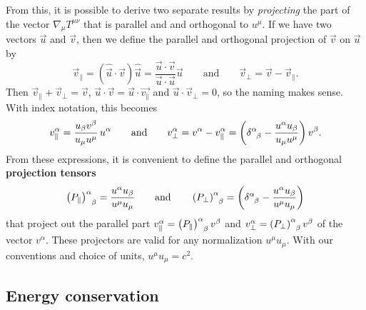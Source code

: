 From this, it is possible to derive two separate results by \emph{projecting} the part of the vector $\nabla_\mu T^{\mu \nu}$ that is parallel and and orthogonal to $u^\mu$.
If we have two vectors $\vec{u}$ and $\vec{v}$, then we define the parallel and orthogonal projection of $\vec{v}$ on $\vec{u}$ by
\begin{equation}
	\vec{v}_\parallel = \left( \hat{\vec{u}} \cdot \vec{v} \right) \hat{\vec{u}} = \frac{\vec{u} \cdot \vec{v}}{\vec{u} \cdot \vec{u}} \vec{u}
	\qquad \text{and} \qquad
	\vec{v}_\perp = \vec{v} - \vec{v}_\parallel .
\end{equation}
Then $\vec{v}_\parallel + \vec{v}_\perp = \vec{v}$, $\vec{u} \cdot \vec{v} = \vec{u} \cdot \vec{v_\parallel}$ and $\vec{u} \cdot \vec{v}_\perp = 0$, so the naming makes sense.
With index notation, this becomes
\begin{equation}
	v_\parallel^\alpha = \frac{u_\beta v^\beta}{u_\mu u^\mu} \, u^\alpha
	\qquad \text{and} \qquad
	v_\perp^\alpha = v^\alpha - v_\parallel^\alpha = \left( \delta\indices{^\alpha_\beta} - \frac{u^\alpha u_\beta}{u_\mu u^\mu} \right) v^\beta .
\end{equation}
From these expressions, it is convenient to define the parallel and orthogonal \textbf{projection tensors}
\begin{equation}
	\left(P_\parallel\right) \indices{^\alpha_\beta} = \frac{u^\alpha u_\beta}{u^\mu u_\mu}
	\qquad \text{and} \qquad
	\left(P_\perp\right) \indices{^\alpha_\beta} = \left( \delta\indices{^\alpha_\beta} - \frac{u^\alpha u_\beta}{u^\mu u_\mu} \right)
\label{eq:relfluid:projection_tensors}
\end{equation}
that project out the parallel part $v_\parallel^\alpha = \left(P_\parallel\right)\indices{^\alpha_\beta} v^\beta$ and $v_\perp^\alpha = \left(P_\perp\right)\indices{^\alpha_\beta} v^\beta$ of the vector $v^\alpha$.
These projectors are valid for any normalization $u^\mu u_\mu$.
With our conventions and choice of units, $u^\mu u_\mu = c^2$.

\subsection{Energy conservation}

